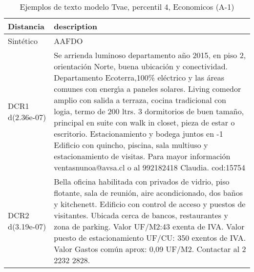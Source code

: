 \begin{table}[H]
\centering
\fontsize{10}{14}\selectfont
\caption{Ejemplos de texto modelo Tvae, percentil 4, Economicos (A-1)}
\label{table-example-economicos-a-1-tvae-4p-text}
\begin{tabular}{|l|m{35em}|}
\hline
\rowcolor[gray]{0.8}
Distancia & description \\
\hline Sintético & AAFDO \\
\hline DCR1 d(2.36e-07) & Se arrienda luminoso departamento a\~no 2015, en piso 2, orientaci\'on Norte, buena ubicaci\'on y conectividad. Departamento Ecoterra,100\% el\'ectrico y las \'areas comunes con energ{\'\i}a a paneles solares. Living comedor amplio con salida a terraza, cocina tradicional con logia, termo de 200 ltrs. 3 dormitorios de buen tama\~no, principal en suite con walk in closet, pieza de estar o escritorio. Estacionamiento y bodega juntos en -1 Edificio con quincho, piscina, sala multiuso y estacionamiento de visitas.  Para mayor informaci\'on ventasnunoa@avsa.cl o al 992182418 Claudia. cod:15754 \\
\hline DCR2 d(3.19e-07) & Bella oficina habilitada con privados de vidrio, piso flotante, sala de reuni\'on, aire acondicionado, dos ba\~nos y kitchenett. Edificio con control de acceso y puestos de visitantes. Ubicada cerca de bancos, restaurantes y zona de parking.  Valor UF/M2:43 exenta de IVA. Valor puesto de estacionamiento UF/CU: 350 exentos de IVA. Valor Gastos com\'un aprox: 0,09 UF/M2.  Contactar al 2 2232 2828. \\
\hline
\end{tabular}
\end{table}
